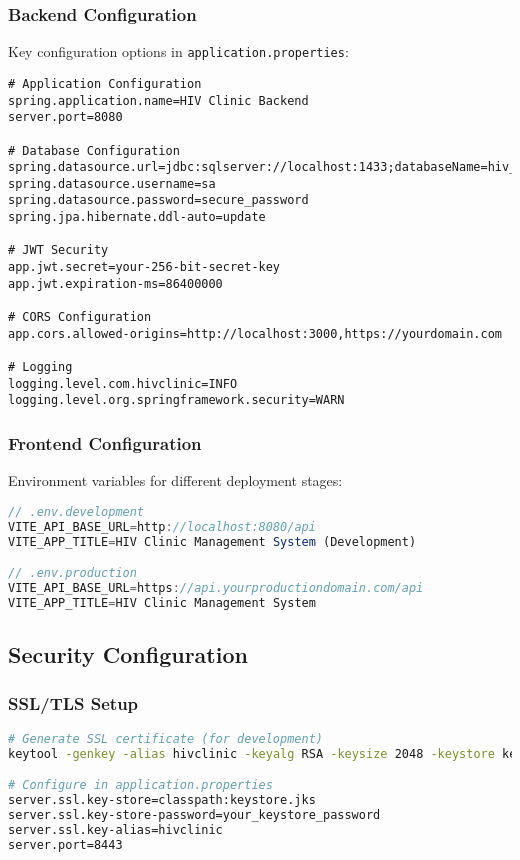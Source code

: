 \documentclass[12pt,a4paper]{article}
\begin{document}
\subsubsection{Backend Configuration}
Key configuration options in \texttt{application.properties}:

\begin{lstlisting}[language=properties]
# Application Configuration
spring.application.name=HIV Clinic Backend
server.port=8080

# Database Configuration
spring.datasource.url=jdbc:sqlserver://localhost:1433;databaseName=hiv_clinic
spring.datasource.username=sa
spring.datasource.password=secure_password
spring.jpa.hibernate.ddl-auto=update

# JWT Security
app.jwt.secret=your-256-bit-secret-key
app.jwt.expiration-ms=86400000

# CORS Configuration
app.cors.allowed-origins=http://localhost:3000,https://yourdomain.com

# Logging
logging.level.com.hivclinic=INFO
logging.level.org.springframework.security=WARN
\end{lstlisting}

\subsubsection{Frontend Configuration}
Environment variables for different deployment stages:

\begin{lstlisting}[language=javascript]
// .env.development
VITE_API_BASE_URL=http://localhost:8080/api
VITE_APP_TITLE=HIV Clinic Management System (Development)

// .env.production
VITE_API_BASE_URL=https://api.yourproductiondomain.com/api
VITE_APP_TITLE=HIV Clinic Management System
\end{lstlisting}

\subsection{Security Configuration}

\subsubsection{SSL/TLS Setup}
\begin{lstlisting}[language=bash]
# Generate SSL certificate (for development)
keytool -genkey -alias hivclinic -keyalg RSA -keysize 2048 -keystore keystore.jks

# Configure in application.properties
server.ssl.key-store=classpath:keystore.jks
server.ssl.key-store-password=your_keystore_password
server.ssl.key-alias=hivclinic
server.port=8443
\end{lstlisting}
\end{document}
